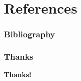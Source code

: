 \documentclass[notes]{beamer}
\begin{document}
\section{References}
\begin{frame} %

\frametitle{Bibliography}




\end{frame}

\begin{frame}
\frametitle{Thanks}
\vskip20pt

\begin{center}
{\bf \color{alert} Thanks!}
\end{center}

\vskip20pt

\begin{center}

\vskip12pt
\end{center}

\titlepage
\end{frame}
\end{document}
